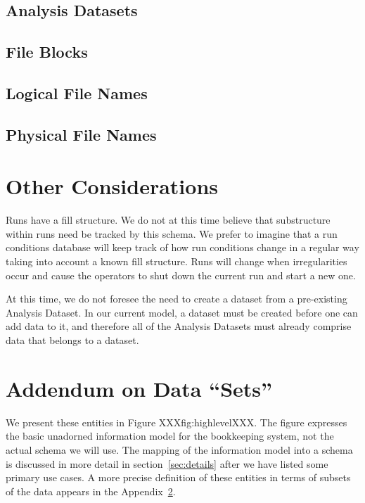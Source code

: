 \documentclass[pdftex]{cmspaper}
\begin{document}
{\subsection{Analysis Datasets}
\subsection{File Blocks}
\subsection{Logical File Names}
\subsection{Physical File Names}

\section{Other Considerations}

Runs have a fill structure.  We do not at this time believe that
substructure within runs need be tracked by this schema.  We prefer
to imagine that a run conditions database will keep track of how run
conditions change in a regular way taking into account a known fill
structure.  Runs will change when irregularities occur and cause the
operators to shut down the current run and start a new one.

At this time, we do not foresee the need to create a dataset from a
pre-existing Analysis Dataset.  In our current model, a dataset must be
created before one can add data to it, and therefore all of the Analysis
Datasets must already comprise data that belongs to a dataset.


\appendix



\section{Addendum on Data ``Sets''}\label{appendix}




We present these entities in Figure XXXfig:highlevelXXX.
The figure expresses the basic unadorned information model
for the bookkeeping system, not the actual schema we will use.
The mapping of the information model into a schema is discussed in more
detail in section~\ref{sec:details} after we have listed some primary use
cases.  A more precise definition of these entities in terms of subsets of
the data appears in the Appendix~\ref{appendix}.



}
\end{document}
